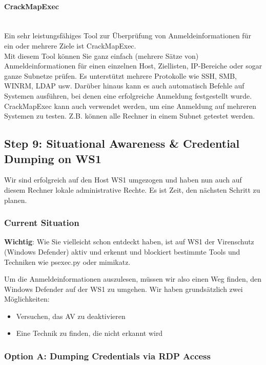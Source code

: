 \paragraph{CrackMapExec}\mbox{} \\
Ein sehr leistungsfähiges Tool zur Überprüfung von Anmeldeinformationen für ein oder mehrere Ziele ist CrackMapExec.\\

Mit diesem Tool können Sie ganz einfach (mehrere Sätze von) Anmeldeinformationen für einen einzelnen Host, Ziellisten, IP-Bereiche oder sogar ganze Subnetze prüfen. Es unterstützt mehrere Protokolle wie SSH, SMB, WINRM, LDAP usw. Darüber hinaus kann es auch automatisch Befehle auf Systemen ausführen, bei denen eine erfolgreiche Anmeldung festgestellt wurde.\\

CrackMapExec kann auch verwendet werden, um eine Anmeldung auf mehreren Systemen zu testen. Z.B. können alle Rechner in einem Subnet getestet werden.



\subsection{Step 9: Situational Awareness \& Credential Dumping on WS1}
Wir sind erfolgreich auf den Host WS1 umgezogen und haben nun auch auf diesem Rechner lokale administrative Rechte. Es ist Zeit, den nächsten Schritt zu planen.

\subsubsection{Current Situation}
\textbf{Wichtig}: Wie Sie vielleicht schon entdeckt haben, ist auf WS1 der Virenschutz (Windows Defender) aktiv und erkennt und blockiert bestimmte Tools und Techniken wie psexec.py oder mimikatz.

Um die Anmeldeinformationen auszulesen, müssen wir also einen Weg finden, den Windows Defender auf der WS1 zu umgehen. Wir haben grundsätzlich zwei Möglichkeiten:\\
\begin{itemize}
    \item Versuchen, das AV zu deaktivieren
    \item Eine Technik zu finden, die nicht erkannt wird
\end{itemize} 

\subsubsection{Option A: Dumping Credentials via RDP Access}
